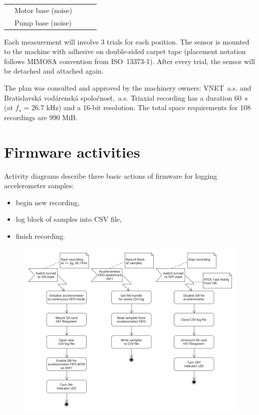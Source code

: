 \begin{table}[ht]
\begin{tabular}{|l|l|p{0.6cm}|p{0.6cm}|p{0.6cm}|p{0.6cm}|p{0.6cm}|p{0.6cm}|}
                                                                                      & Motor base (noise)                      & \multicolumn{2}{p{1.2cm}|}{}                 & \multicolumn{2}{p{1.2cm}|}{}                 & \multicolumn{2}{p{1.2cm}|}{}                 \\ \cline{2-8} 
                                                                                      & Pump base (noise)                       & \multicolumn{2}{p{1.2cm}|}{}                 & \multicolumn{2}{p{1.2cm}|}{}                 & \multicolumn{2}{p{1.2cm}|}{}                 \\ \hline
\end{tabular}
\end{table}
Each measurement will involve 3 trials for each position. The sensor is mounted to the machine with adhesive on double-sided carpet tape (placement notation follows MIMOSA convention from ISO~13373-1). After every trial, the sensor will be detached and attached again. 

The plan was consulted and approved by the machinery owners: VNET~a.s. and Bratislavská vodárenská spoločnosť,~a.s. Triaxial recording has a duration 60~s (at $f_s$ = 26.7 kHz) and a 16-bit resolution. The total space requirements for 108 recordings are 990 MiB.

\section{Firmware activities}
Activity diagrams describe three basic actions of firmware for logging accelerometer samples:

\begin{itemize}
\itemsep0pt
\item begin new recording, 
\item log block of samples into CSV file,
\item finish recording.
\end{itemize}

\begin{figure}[h]
    \centering
	\includegraphics[width=\textwidth]{assets/design/firmware-design.png}
\end{figure} 

